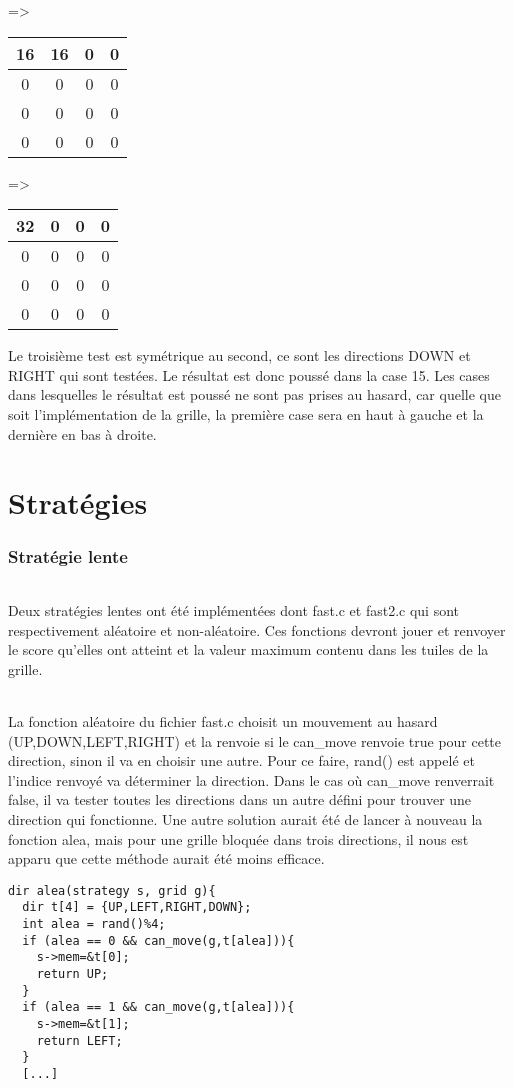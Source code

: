 \documentclass{report}
\begin{document}
\begin{center}
=> \begin{tabular}{|c|c|c|c|}
  \hline
  16 & 16 & 0 & 0 \\
  \hline
  0 & 0 & 0 & 0 \\
  \hline
  0 & 0 & 0 & 0 \\
  \hline
  0 & 0 & 0 & 0 \\
  \hline
\end{tabular} =>
\begin{tabular}{|c|c|c|c|}
  \hline
  32 & 0 & 0 & 0 \\
  \hline
  0 & 0 & 0 & 0 \\
  \hline
  0 & 0 & 0 & 0 \\
  \hline
  0 & 0 & 0 & 0 \\
  \hline
\end{tabular}
\end{center}

Le troisième test est symétrique au second, ce sont les directions DOWN et RIGHT qui sont testées. Le résultat est donc poussé dans la case 15.
Les cases dans lesquelles le résultat est poussé ne sont pas prises au hasard, car quelle que soit l'implémentation de la grille, la première case sera en haut à gauche et la dernière en bas à droite.

\part{Stratégies}
\section*{Stratégie lente}
\paragraph{} Deux stratégies lentes ont été implémentées dont fast.c et fast2.c qui sont respectivement  aléatoire et non-aléatoire.
Ces fonctions devront jouer et renvoyer le score qu'elles ont atteint et la valeur maximum contenu dans les tuiles de la grille.

\paragraph{}
La fonction aléatoire du fichier fast.c choisit un mouvement au hasard (UP,DOWN,LEFT,RIGHT) et  la renvoie si le can{\_}move renvoie true pour cette direction, sinon il va en choisir une autre. Pour ce faire, rand() est appelé et l'indice renvoyé va déterminer la direction. Dans le cas où can{\_}move renverrait false, il va tester toutes les directions dans un autre défini pour trouver une direction qui fonctionne. Une autre solution aurait été de lancer à nouveau la fonction alea, mais pour une grille bloquée dans trois directions, il nous est apparu que cette méthode aurait été moins efficace.
\begin{lstlisting}
dir alea(strategy s, grid g){
  dir t[4] = {UP,LEFT,RIGHT,DOWN};
  int alea = rand()%4;
  if (alea == 0 && can_move(g,t[alea])){
    s->mem=&t[0];
    return UP;
  }
  if (alea == 1 && can_move(g,t[alea])){
    s->mem=&t[1];
    return LEFT;
  }
  [...]
\end{lstlisting}
\end{document}
